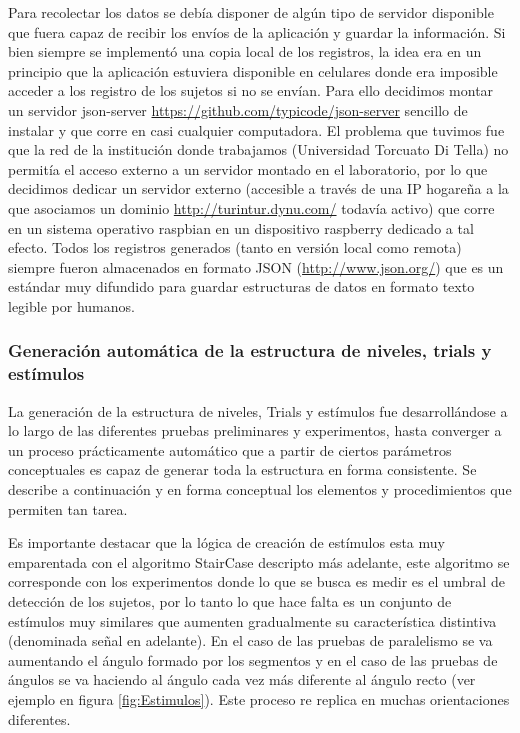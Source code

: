 \documentclass{article}
\begin{document}
    Para recolectar los datos se debía disponer de algún tipo de servidor disponible que fuera capaz de recibir los envíos de la aplicación y guardar la información. Si bien siempre se implementó una copia local de los registros, la idea era en un principio que la aplicación estuviera disponible en celulares donde era imposible acceder a los registro de los sujetos si no se envían. Para ello decidimos montar un servidor json-server \url{https://github.com/typicode/json-server} sencillo de instalar y que corre en casi cualquier computadora. El problema que tuvimos fue que la red de la institución donde trabajamos (Universidad Torcuato Di Tella) no permitía el acceso externo a un servidor montado en el laboratorio, por lo que decidimos dedicar un servidor externo (accesible a través de una IP hogareña a la que asociamos un dominio \url{http://turintur.dynu.com/} todavía activo) que corre en un sistema operativo raspbian en un dispositivo raspberry dedicado a tal efecto. Todos los registros generados (tanto en versión local como remota) siempre fueron almacenados en formato JSON (\url{http://www.json.org/}) que es un estándar muy difundido para guardar estructuras de datos en formato texto legible por humanos. 
    
    \subsubsection{Generación automática de la estructura de niveles, trials y estímulos} \label{seccion:builder}
    
    La generación de la estructura de niveles, Trials y estímulos fue desarrollándose a lo largo de las diferentes pruebas preliminares y experimentos, hasta converger a un proceso prácticamente automático que a partir de ciertos parámetros conceptuales es capaz de generar toda la estructura en forma consistente. Se describe a continuación y en forma conceptual los elementos y procedimientos que permiten tan tarea. 
    
    Es importante destacar que la lógica de creación de estímulos esta muy emparentada con el algoritmo StairCase descripto más adelante, este algoritmo se corresponde con los experimentos donde lo que se busca es medir es el umbral de detección de los sujetos, por lo tanto lo que hace falta es un conjunto de estímulos muy similares que aumenten gradualmente su característica distintiva (denominada señal en adelante). En el caso de las pruebas de paralelismo se va aumentando el ángulo formado por los segmentos y en el caso de las pruebas de ángulos se va haciendo al ángulo cada vez más diferente al ángulo recto (ver ejemplo en figura \ref{fig:Estimulos}). Este proceso re replica en muchas orientaciones diferentes.
    
\end{document}
